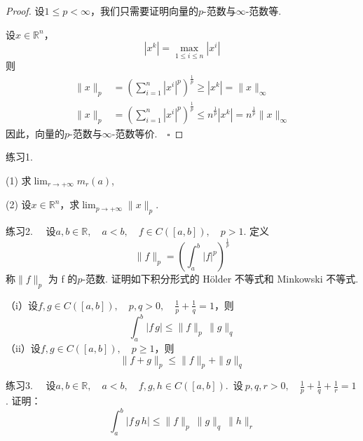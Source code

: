 \documentclass{article}
\begin{document}
\begin{proof}
设\(1 \le p < \infty \)，我们只需要证明向量的\(p\)-范数与\(\infty \)-范数等.

设\(x \in \mathbb{R}^n\)，
\begin{equation*}
    | x^k |= \max_{1 \le i \le n }| x^i |
\end{equation*}
则
\begin{align*}
    \|x\|_p &= \left( \sum_{i=1}^n | x^i |^p  \right)^\frac{1}{p} \ge | x^k |=\|x\|_{\infty } \\
    \|x\|_p &= \left( \sum_{i=1}^n | x^i |^p  \right)^\frac{1}{p}
    \le n^{\frac{1}{p} }| x^k |= n^{\frac{1}{p} }\|x\|_{\infty }
\end{align*}
因此，向量的\(p\)-范数与\(\infty \)-范数等价.\(\quad \square\)
\end{proof}

\newpage

练习1.

\noindent (1) 求\(\lim_{r \to + \infty }m_r(a) \),

\noindent (2) 设\(x \in \mathbb{R}^n\)，求\(\lim_{p \to + \infty }\|x\|_p \).

\vspace{20pt}

\noindent 练习2. \ \ 设\(a, b \in \mathbb{R},\quad a < b,\quad f \in C \left( [a,b] \right),\quad p > 1 \). 定义
\begin{equation*}
    \|f\|_p = \left( \int_{a}^{b} | f |^p  \right)^\frac{1}{p}
\end{equation*}
称\(\|f\|_p\) 为 f 的\(p\)-范数. 证明如下积分形式的 H\"older 不等式和 Minkowski 不等式.
\vspace{10pt}

\noindent（i）设\(f, g \in C \left( [a,b] \right),\quad p, q > 0,\quad \frac{1}{p } + \frac{1}{q} = 1 \)，则
\begin{equation*}
    \int_{a}^{b}| f\,g |  \le \|f\|_p\,\|g\|_q
\end{equation*}
（ii）设\(f, g \in C \left( [a,b] \right),\quad p \ge 1\)，则
\begin{equation*}
    \|f + g\|_p \le \|f\|_p +\|g\|_q
\end{equation*}

\vspace{20pt}

\noindent 练习3. \ \ 设\(a, b \in \mathbb{R},\quad a < b,\quad f, g, h \in C \left( [a,b] \right)\).\ 设\(\ p, q, r > 0,\quad \frac{1}{p} + \frac{1}{q} + \frac{1}{r} = 1\). 证明：
\begin{equation*}
    \int_{a}^{b} | f \, g \, h | \le \|f\|_p\ \|g\|_q\ \|h\|_r
\end{equation*}
\end{document}
